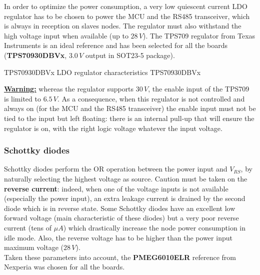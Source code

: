 In order to optimize the power consumption, a very low quiescent current LDO regulator has to be chosen to power the MCU and the RS485 transceiver, which is always in reception on slaves nodes. The regulator must also withstand the high voltage input when available (up to $ 28\,V $). The TPS709 regulator from Texas Instruments is an ideal reference and has been selected for all the boards (\textbf{TPS70930DBVx}, $ 3.0\,V $ output in SOT23-5 package). \pfs

{TPS70930DBVx LDO regulator characteristics}
{TPS70930DBVx}

\textbf{\underline{Warning:}} whereas the regulator supports $ 30\,V $, the enable input of the TPS709 is limited to $ 6.5\,V $. As a consequence, when this regulator is not controlled and always on (for the MCU and the RS485 transceiver) the enable input must not be tied to the input but left floating: there is an internal pull-up that will ensure the regulator is on, with the right logic voltage whatever the input voltage.

\newpage

\subsubsection{Schottky diodes}

Schottky diodes perform the OR operation between the power input and $ V_{RS} $, by naturally selecting the highest voltage as source. Caution must be taken on the \textbf{reverse current}: indeed, when one of the voltage inputs is not available (especially the power input), an extra leakage current is drained by the second diode which is in reverse state. Some Schottky diodes have an excellent low forward voltage (main characteristic of these diodes) but a very poor reverse current (tens of $ \mu A $) which drastically increase the node power consumption in idle mode. Also, the reverse voltage has to be higher than the power input maximum voltage ($ 28\,V $).
\medskip \\
Taken these parameters into account, the \textbf{PMEG6010ELR} reference from Nexperia was chosen for all the boards. \pfs

